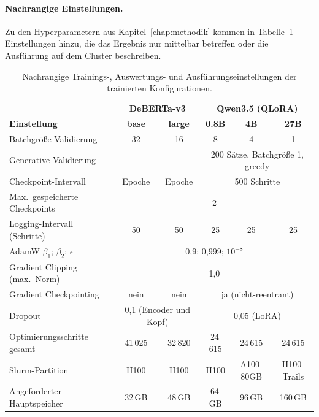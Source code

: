 \paragraph{Nachrangige Einstellungen.}
Zu den Hyperparametern aus Kapitel~\ref{chap:methodik} kommen in
Tabelle~\ref{tab:app-einstellungen} Einstellungen hinzu, die das Ergebnis
nur mittelbar betreffen oder die Ausführung auf dem Cluster beschreiben.

\begin{table}[ht]
  \centering
  \footnotesize
  \caption[Nachrangige Trainings-, Auswertungs- und Ausführungseinstellungen]{Nachrangige Trainings-, Auswertungs- und
  Ausführungseinstellungen der trainierten Konfigurationen.}
  \label{tab:app-einstellungen}
  \setlength{\tabcolsep}{4pt}
  \begin{tabular}{lccccc}
    \toprule
    & \multicolumn{2}{c}{\textbf{DeBERTa-v3}} &
      \multicolumn{3}{c}{\textbf{Qwen3.5 (QLoRA)}} \\
    \textbf{Einstellung} & \textbf{base} & \textbf{large} &
      \textbf{0.8B} & \textbf{4B} & \textbf{27B} \\
    \midrule
    Batchgröße Validierung & 32 & 16 & 8 & 4 & 1 \\
    Generative Validierung & -- & -- &
      \multicolumn{3}{c}{200 Sätze, Batchgröße 1, greedy} \\
    Checkpoint-Intervall & Epoche & Epoche &
      \multicolumn{3}{c}{500 Schritte} \\
    Max.\ gespeicherte Checkpoints & \multicolumn{5}{c}{2} \\
    Logging-Intervall (Schritte) & 50 & 50 & 25 & 25 & 25 \\
    AdamW $\beta_1$; $\beta_2$; $\epsilon$ &
      \multicolumn{5}{c}{0,9; 0,999; $10^{-8}$} \\
    Gradient Clipping (max.\ Norm) & \multicolumn{5}{c}{1,0} \\
    Gradient Checkpointing & nein & nein &
      \multicolumn{3}{c}{ja (nicht-reentrant)} \\
    Dropout & \multicolumn{2}{c}{0,1 (Encoder und Kopf)} &
      \multicolumn{3}{c}{0,05 (LoRA)} \\
    Optimierungsschritte gesamt & 41\,025 & 32\,820 & 24\,615 & 24\,615 &
      24\,615 \\
    Slurm-Partition & H100 & H100 & H100 & A100-80GB & H100-Trails \\
    Angeforderter Hauptspeicher & 32\,GB & 48\,GB & 64\,GB & 96\,GB &
      160\,GB \\
    \bottomrule
  \end{tabular}
\end{table}

